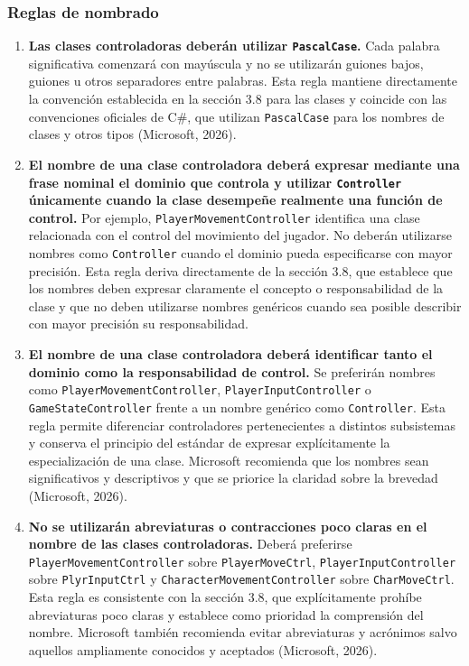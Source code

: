 
\subsubsection{Reglas de nombrado}

\begin{enumerate}

\item \textbf{Las clases controladoras deberán utilizar \texttt{PascalCase}.} Cada palabra significativa comenzará con mayúscula y no se utilizarán guiones bajos, guiones u otros separadores entre palabras. Esta regla mantiene directamente la convención establecida en la sección 3.8 para las clases y coincide con las convenciones oficiales de C\#, que utilizan \texttt{PascalCase} para los nombres de clases y otros tipos (Microsoft, 2026).

\item \textbf{El nombre de una clase controladora deberá expresar mediante una frase nominal el dominio que controla y utilizar \texttt{Controller} únicamente cuando la clase desempeñe realmente una función de control.} Por ejemplo, \texttt{PlayerMovementController} identifica una clase relacionada con el control del movimiento del jugador. No deberán utilizarse nombres como \texttt{Controller} cuando el dominio pueda especificarse con mayor precisión. Esta regla deriva directamente de la sección 3.8, que establece que los nombres deben expresar claramente el concepto o responsabilidad de la clase y que no deben utilizarse nombres genéricos cuando sea posible describir con mayor precisión su responsabilidad.

\item \textbf{El nombre de una clase controladora deberá identificar tanto el dominio como la responsabilidad de control.} Se preferirán nombres como \texttt{PlayerMovementController}, \texttt{PlayerInputController} o \texttt{GameStateController} frente a un nombre genérico como \texttt{Controller}. Esta regla permite diferenciar controladores pertenecientes a distintos subsistemas y conserva el principio del estándar de expresar explícitamente la especialización de una clase. Microsoft recomienda que los nombres sean significativos y descriptivos y que se priorice la claridad sobre la brevedad (Microsoft, 2026).

\item \textbf{No se utilizarán abreviaturas o contracciones poco claras en el nombre de las clases controladoras.} Deberá preferirse \texttt{PlayerMovementController} sobre \texttt{PlayerMoveCtrl}, \texttt{PlayerInputController} sobre \texttt{PlyrInputCtrl} y \texttt{CharacterMovementController} sobre \texttt{CharMoveCtrl}. Esta regla es consistente con la sección 3.8, que explícitamente prohíbe abreviaturas poco claras y establece como prioridad la comprensión del nombre. Microsoft también recomienda evitar abreviaturas y acrónimos salvo aquellos ampliamente conocidos y aceptados (Microsoft, 2026).


\end{enumerate}
